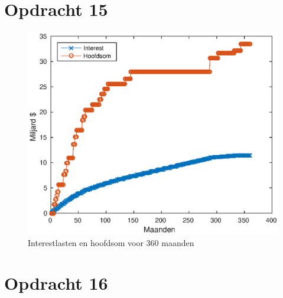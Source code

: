 \documentclass[11pt,a4paper]{article}
\begin{document}
\section*{Opdracht 15}
\begin{figure}[H]
\centering
\includegraphics[scale=0.75]{opdracht15}
\caption{Interestlasten en hoofdsom voor 360 maanden}
\end{figure}


\section*{Opdracht 16}


\end{document}

